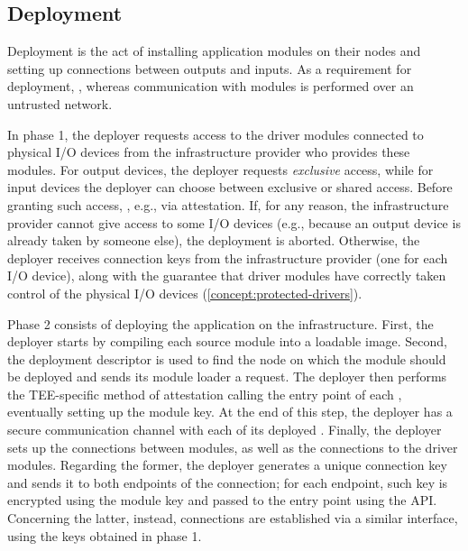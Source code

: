 \subsection{Deployment} \label{concept:deployment}
%
Deployment is the act of installing application modules on their nodes and
setting up connections between outputs and inputs. As a requirement for
deployment, , whereas communication with
modules is performed over an untrusted network.

In phase 1, the deployer requests access to the driver modules connected to
physical I/O devices from the infrastructure provider who provides these
modules. For output devices, the deployer requests \emph{exclusive} access,
while for input devices the deployer can choose between exclusive or shared
access.  Before granting such access, , e.g., via attestation.  If, for any reason, the infrastructure
provider cannot give access to some I/O devices (e.g., because an output device
is already taken by someone else), the deployment is aborted.  Otherwise, the
deployer receives connection keys from the infrastructure provider (one for each
I/O device), along with the guarantee that driver modules have correctly taken
control of the physical I/O devices (\cref{concept:protected-drivers}).

Phase 2 consists of deploying the application on the infrastructure. First, the
deployer starts by compiling each source module into a loadable image.  Second,
the deployment descriptor is used to find the node on which the module should be
deployed and sends its module loader a \loadmodule{} request. The deployer then
performs the \ac{TEE}-specific method of attestation calling the \attest{} entry
point of each \protmod, eventually setting up the module key. At the end of this
step, the deployer has a secure communication channel with each of its deployed
\reactmods. Finally, the deployer sets up the connections between modules, as
well as the connections to the driver modules. Regarding the former, the
deployer generates a unique connection key and sends it to both endpoints of the
connection; for each endpoint, such key is encrypted using the module key and
passed to the \setkey{} entry point using the \callentry{} API. Concerning the
latter, instead, connections are established via a similar interface, using the
keys obtained in phase 1.

